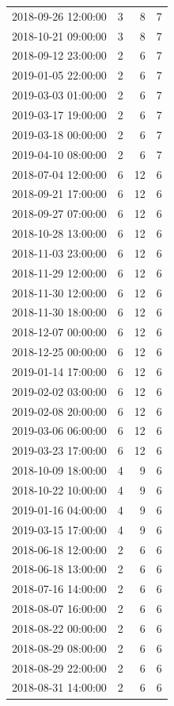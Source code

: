 \begin{tabular}{lrrr}
2018-09-26 12:00:00 & 3 & 8 & 7 \\
2018-10-21 09:00:00 & 3 & 8 & 7 \\
2018-09-12 23:00:00 & 2 & 6 & 7 \\
2019-01-05 22:00:00 & 2 & 6 & 7 \\
2019-03-03 01:00:00 & 2 & 6 & 7 \\
2019-03-17 19:00:00 & 2 & 6 & 7 \\
2019-03-18 00:00:00 & 2 & 6 & 7 \\
2019-04-10 08:00:00 & 2 & 6 & 7 \\
2018-07-04 12:00:00 & 6 & 12 & 6 \\
2018-09-21 17:00:00 & 6 & 12 & 6 \\
2018-09-27 07:00:00 & 6 & 12 & 6 \\
2018-10-28 13:00:00 & 6 & 12 & 6 \\
2018-11-03 23:00:00 & 6 & 12 & 6 \\
2018-11-29 12:00:00 & 6 & 12 & 6 \\
2018-11-30 12:00:00 & 6 & 12 & 6 \\
2018-11-30 18:00:00 & 6 & 12 & 6 \\
2018-12-07 00:00:00 & 6 & 12 & 6 \\
2018-12-25 00:00:00 & 6 & 12 & 6 \\
2019-01-14 17:00:00 & 6 & 12 & 6 \\
2019-02-02 03:00:00 & 6 & 12 & 6 \\
2019-02-08 20:00:00 & 6 & 12 & 6 \\
2019-03-06 06:00:00 & 6 & 12 & 6 \\
2019-03-23 17:00:00 & 6 & 12 & 6 \\
2018-10-09 18:00:00 & 4 & 9 & 6 \\
2018-10-22 10:00:00 & 4 & 9 & 6 \\
2019-01-16 04:00:00 & 4 & 9 & 6 \\
2019-03-15 17:00:00 & 4 & 9 & 6 \\
2018-06-18 12:00:00 & 2 & 6 & 6 \\
2018-06-18 13:00:00 & 2 & 6 & 6 \\
2018-07-16 14:00:00 & 2 & 6 & 6 \\
2018-08-07 16:00:00 & 2 & 6 & 6 \\
2018-08-22 00:00:00 & 2 & 6 & 6 \\
2018-08-29 08:00:00 & 2 & 6 & 6 \\
2018-08-29 22:00:00 & 2 & 6 & 6 \\
2018-08-31 14:00:00 & 2 & 6 & 6 \\

\end{tabular}
